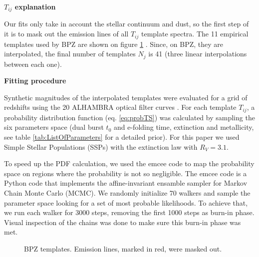 \documentclass[a4paper, useAMS, usenatbib, hyperpdf]{mn2e}
\begin{document}
{\bf {\color{red} $T_{ij}$ explanation}}

Our fits only take in account the stellar continuum and dust, so the first step of it is to mask out the emission lines of all $T_{ij}$ template spectra. The 11 empirical templates used by BPZ are shown on figure \ref{fig:bpz_templates} . Since, on BPZ, they are interpolated, the final number of templates $N_j$ is 41 (three linear interpolations between each one).

{\bf {\color{red} Fitting procedure}}

Synthetic magnitudes of the interpolated templates were evaluated for a grid of redshifts using the 20 ALHAMBRA optical filter curves \citep{Molino.etal.2014a}. For each template $T_{ij}$, a probability distribution function (eq. \ref{eq:probTS}) was calculated by sampling the six parameters space (dual burst $t_0$ and e-folding time, extinction and metallicity, see table \ref{tab:ListOfParameters} for a detailed prior). For this paper we used \cite{Bruzual.Charlot.2003a} Simple Stellar Populations (SSPs) with the \cite{Cardelli.Clayton.Mathis.1989a} extinction law with $R_V = 3.1$. 

To speed up the PDF calculation, we used the emcee code \citep{ForemanMackey.etal.2013a} to map the probability space on regions where the probability is not so negligible. The emcee code is a Python code that implements the affine-invariant ensamble sampler for Markov Chain Monte Carlo (MCMC). We randomly initialize 70 walkers and sample the parameter space looking for a set of most probable likelihoods. To achieve that, we run each walker for 3000 steps, removing the first 1000 steps as burn-in phase. Visual inspection of the chains was done to make sure this burn-in phase was met.


\begin{figure}
\label{fig:bpz_templates}
\caption{BPZ templates. Emission lines, marked in red, were masked out.}
\end{figure}
\end{document}
